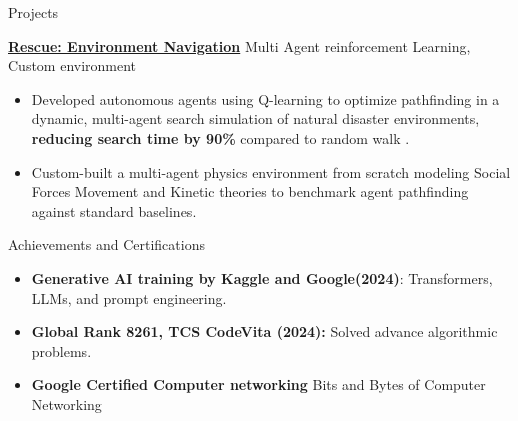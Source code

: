 \documentclass{resume}
\begin{document}
\begin{rSection}{Projects}
\begin{itemize}
    \end{itemize}
    {\large \href{https://github.com/Bharat269/ProjectExhibition-2-Search-Rescue}{\textbf{Rescue: Environment Navigation}}}  Multi Agent reinforcement Learning, Custom environment
    \begin{itemize}
    \item Developed autonomous agents using Q-learning to optimize pathfinding in a dynamic, multi-agent search simulation of natural disaster environments,\textbf{ reducing search time by 90\%} compared to random walk .  
    \item Custom-built a multi-agent physics environment from scratch modeling Social Forces Movement and Kinetic theories to benchmark agent pathfinding against standard baselines. 
    \end{itemize}
\end{rSection}

\begin{rSection}{Achievements and Certifications}
\begin{itemize}
\item \textbf{Generative AI training by Kaggle and Google(2024)}: Transformers, LLMs, and prompt engineering.  
\item \textbf{Global Rank 8261, TCS CodeVita (2024):} Solved advance algorithmic problems. 
    \item \textbf{Google Certified Computer networking }Bits and Bytes of Computer Networking 
\end{itemize}
\end{rSection}
\end{document}
